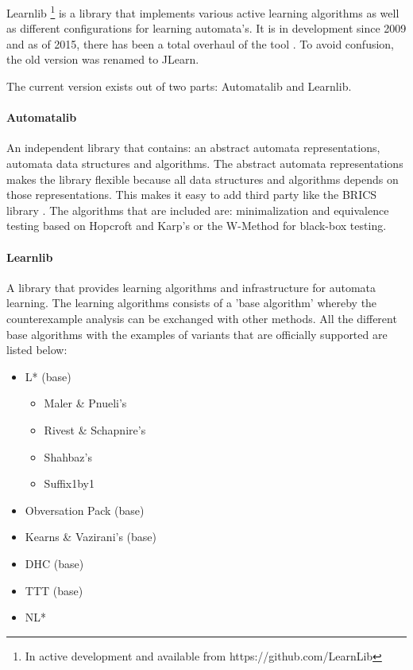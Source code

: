 \documentclass[multi,crop=false,class=article]{standalone}
\begin{document}
Learnlib  \footnote{In active development and available from
https://github.com/LearnLib } is a library that implements various active
learning algorithms as well as different configurations for learning
automata's. It is in development since 2009 \cite{Raffelt2009} and as of 2015,
there has been a
total overhaul of the tool \cite{Isberner2015}. To avoid confusion, the old
version was renamed
to JLearn.

The current version exists out of two parts: Automatalib and Learnlib.


\paragraph{Automatalib} An independent library that contains: an abstract
automata representations, automata data structures and algorithms. The abstract
automata representations makes the library flexible because all data structures
and algorithms depends on those representations. This makes it easy to add
third party like the BRICS library \cite{Alur:2005:SIS:1047659.1040314}. The
algorithms that are included are: minimalization and equivalence testing based
on Hopcroft and Karp's \cite{hopcroft1971linear} or the W-Method for black-box
testing.

\paragraph{Learnlib} A library that provides learning algorithms and
infrastructure for automata learning. The learning algorithms consists of a
'base algorithm' whereby the counterexample analysis can be exchanged with
other methods. All the different base algorithms with the examples of variants
that are officially supported are listed below:

\begin{itemize}
	\item L* (base)
	\begin{itemize}
		\item Maler \& Pnueli's
		\item Rivest \& Schapnire's
		\item Shahbaz's
		\item Suffix1by1
	\end{itemize}
	\item Obversation Pack (base)
	\item Kearns \& Vazirani's (base)
	\item DHC (base)
	\item TTT (base)
	\item NL*
\end{itemize}
\end{document}
